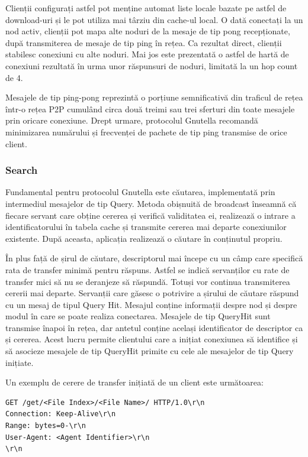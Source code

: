 Clienții configurați astfel pot menține automat liste locale bazate pe astfel
de download-uri și le pot utiliza mai târziu din cache-ul local. O dată
conectați la un nod activ, clienții pot mapa alte noduri de la mesaje de tip
pong recepționate, după transmiterea de mesaje de tip ping în rețea. Ca
rezultat direct, clienții stabilesc conexiuni cu alte noduri. Mai jos este
prezentată o astfel de hartă de conexiuni rezultată în urma unor răspunsuri de
noduri, limitată la un hop count de 4.

Mesajele de tip ping-pong reprezintă o porțiune semnificativă din traficul de
rețea într-o rețea P2P cumulând circa două treimi sau trei sferturi din toate
mesajele prin oricare conexiune. Drept urmare, protocolul Gnutella recomandă
minimizarea numărului și frecvenței de pachete de tip ping transmise de orice
client.

\subsubsection{Search}

Fundamental pentru protocolul Gnutella este căutarea, implementată prin
intermediul mesajelor de tip Query. Metoda obișnuită de broadcast înseamnă că
fiecare servant care obține cererea și verifică validitatea ei, realizează o
intrare a identificatorului în tabela cache și transmite cererea mai departe
conexiunilor existente. După aceasta, aplicația realizează o căutare în
conținutul propriu.

În plus față de șirul de căutare, descriptorul mai începe cu un câmp care
specifică rata de transfer minimă pentru răspuns. Astfel se indică servanților
cu rate de transfer mici să nu se deranjeze să răspundă. Totuși vor continua
transmiterea cererii mai departe. Servanții care găsesc o potrivire a șirului
de căutare răspund cu un mesaj de tipul Query Hit. Mesajul conține informații
despre nod și despre modul în care se poate realiza conectarea. Mesajele de
tip QueryHit sunt transmise înapoi în rețea, dar antetul conține același
identificator de descriptor ca și cererea. Acest lucru permite clientului care
a inițiat conexiunea să identifice și să asocieze mesajele de tip QueryHit
primite cu cele ale mesajelor de tip Query inițiate.

Un exemplu de cerere de transfer inițiată de un client este următoarea:

\begin{verbatim}
GET /get/<File Index>/<File Name>/ HTTP/1.0\r\n
Connection: Keep-Alive\r\n
Range: bytes=0-\r\n
User-Agent: <Agent Identifier>\r\n
\r\n
\end{verbatim}

